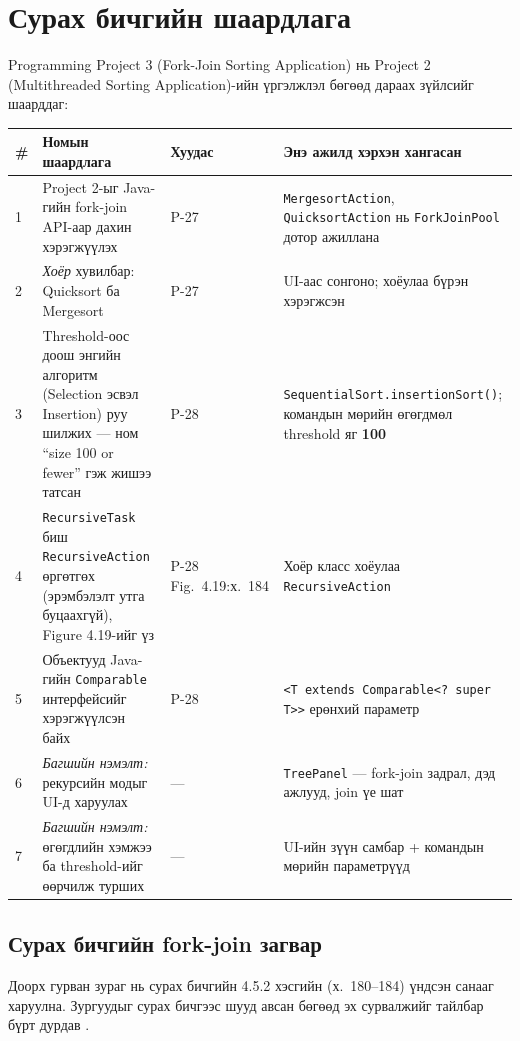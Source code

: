 \documentclass[11pt,a4paper]{article}
\begin{document}
\section{Сурах бичгийн шаардлага}

Programming Project 3 (Fork-Join Sorting Application) нь Project 2
(Multithreaded Sorting Application)-ийн үргэлжлэл бөгөөд дараах зүйлсийг
шаарддаг:

\begin{center}
\small
\begin{tabular}{L{0.6cm}L{5.9cm}L{1.6cm}L{6.2cm}}
\toprule
\# & Номын шаардлага & Хуудас & Энэ ажилд хэрхэн хангасан \\
 & Project 2-ыг Java-гийн fork-join API-аар дахин хэрэгжүүлэх & P-27 &
\texttt{MergesortAction}, \texttt{QuicksortAction} нь \texttt{ForkJoinPool}
дотор ажиллана \\
2 & \emph{Хоёр} хувилбар: Quicksort ба Mergesort & P-27 &
UI-аас сонгоно; хоёулаа бүрэн хэрэгжсэн \\
3 & Threshold-оос доош энгийн алгоритм (Selection эсвэл Insertion) руу шилжих
--- ном ``size 100 or fewer'' гэж жишээ татсан & P-28 &
\texttt{SequentialSort.insertionSort()}; командын мөрийн өгөгдмөл threshold
яг \textbf{100} \\
4 & \texttt{RecursiveTask} биш \texttt{RecursiveAction} өргөтгөх
(эрэмбэлэлт утга буцаахгүй), Figure 4.19-ийг үз & P-28 \newline Fig.~4.19:\newline х.~184 &
Хоёр класс хоёулаа \texttt{RecursiveAction} \\
5 & Объектууд Java-гийн \texttt{Comparable} интерфейсийг хэрэгжүүлсэн байх &
P-28 & \texttt{<T extends Comparable<? super T>>} ерөнхий параметр \\
 & \emph{Багшийн нэмэлт:} рекурсийн модыг UI-д харуулах & --- &
\texttt{TreePanel} --- fork-join задрал, дэд ажлууд, join үе шат \\
7 & \emph{Багшийн нэмэлт:} өгөгдлийн хэмжээ ба threshold-ийг өөрчилж турших & --- &
UI-ийн зүүн самбар + командын мөрийн параметрүүд \\
\bottomrule
\end{tabular}
\end{center}

\subsection{Сурах бичгийн fork-join загвар}

Доорх гурван зураг нь сурах бичгийн 4.5.2 хэсгийн (х.~180--184) үндсэн
санааг харуулна. Зургуудыг сурах бичгээс шууд авсан бөгөөд эх сурвалжийг
тайлбар бүрт дурдав \cite{osc}.
\end{document}
